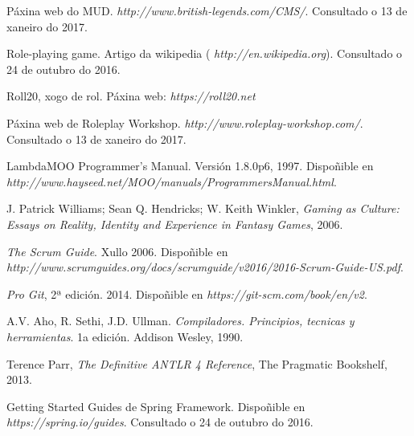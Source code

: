 

\begin{thebibliography}{99}

 Páxina web do MUD. \textit{ http://www.british-legends.com/CMS/}.
Consultado o 13 de xaneiro do 2017.

 Role-playing game. Artigo da wikipedia (\textit{
http://en.wikipedia.org}). Consultado o 24 de outubro do 2016.

 Roll20, xogo de rol. Páxina web: \textit{ https://roll20.net}

 Páxina web de Roleplay Workshop. \textit{
http://www.roleplay-workshop.com/}. Consultado o 13 de xaneiro do 2017.

 LambdaMOO Programmer's Manual. Versión 1.8.0p6, 1997.
Dispoñible en \textit{ http://www.hayseed.net/MOO/manuals/ProgrammersManual.html}.

 J. Patrick Williams; Sean Q. Hendricks; W. Keith
Winkler, \textit{ Gaming as Culture: Essays on Reality, Identity and Experience in
Fantasy Games}, 2006.

 \textit{ The Scrum Guide}. Xullo 2006. Dispoñible en \textit{
http://www.scrumguides.org/docs/scrumguide/v2016/2016-Scrum-Guide-US.pdf}.

 \textit{ Pro Git}, 2ª edición. 2014. Dispoñible en \textit{
https://git-scm.com/book/en/v2}.

 A.V. Aho, R. Sethi, J.D. Ullman. \textit{Compiladores.
Principios, tecnicas y herramientas}. 1a edición. Addison Wesley, 1990.

 Terence Parr, \textit{ The Definitive ANTLR 4 Reference}, The
Pragmatic Bookshelf, 2013.



 Getting Started Guides de Spring Framework. Dispoñible en \textit{
https://spring.io/guides}. Consultado o 24 de outubro do 2016.

\end{thebibliography}